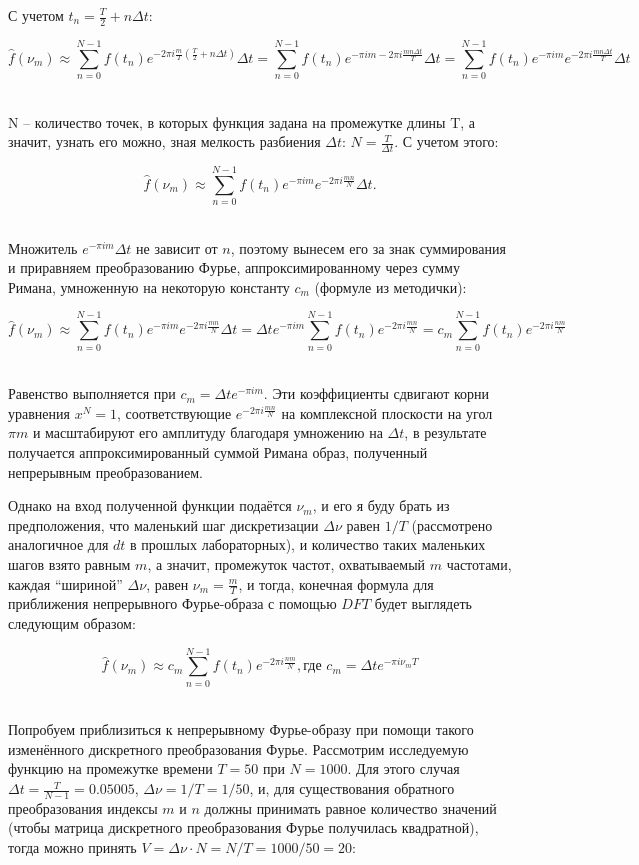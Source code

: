 \documentclass[a4paper]{article}
\begin{document}
С учетом $t_n = \frac{T}{2} + n\Delta t$:

$$
\hat{f}(\nu_m) \approx \sum_{n = 0}^{N - 1} f(t_n)e^{-2\pi i \frac{m}{T} (\frac{T}{2} + n\Delta t)}\Delta t = \sum_{n = 0}^{N - 1} f(t_n)e^{-\pi i m -2\pi i \frac{mn\Delta t}{T}} \Delta t = \sum_{n = 0}^{N - 1} f(t_n)e^{-\pi i m} e^{-2\pi i \frac{mn\Delta t}{T}} \Delta t
$$\

N -- количество точек, в которых функция задана на промежутке длины T, а значит, узнать его можно, зная мелкость разбиения  $\Delta t$: $N = \frac{T}{\Delta t}$. С учетом этого:

$$
\hat{f}(\nu_m) \approx \sum_{n = 0}^{N - 1} f(t_n)e^{-\pi i m} e^{-2\pi i \frac{mn}{N}} \Delta t.
$$\

Множитель $e^{-\pi i m}\Delta t$ не зависит от $n$, поэтому вынесем его за знак суммирования и приравняем преобразованию Фурье, аппроксимированному через сумму Римана, умноженную на некоторую константу $c_m$ (формуле из методички):

$$
\hat{f}(\nu_m) \approx \sum_{n = 0}^{N - 1} f(t_n)e^{-\pi i m} e^{-2\pi i \frac{mn}{N}} \Delta t = \Delta t e^{-\pi i m} \sum_{n = 0}^{N - 1} f(t_n)e^{-2\pi i \frac{mn}{N}} = c_m\sum_{n = 0}^{N - 1} f(t_n)e^{-2\pi i \frac{nm}{N}}
$$\

Равенство выполняется при $c_m = \Delta t e^{-\pi i m}$. Эти коэффициенты сдвигают корни уравнения $x^N = 1$, соответствующие $e^{-2\pi i \frac{mn}{N}}$ на комплексной плоскости на угол $\pi m$ и масштабируют его амплитуду благодаря умножению на $\Delta t$, в результате получается аппроксимированный суммой Римана образ, полученный непрерывным преобразованием.

Однако на вход полученной функции подаётся $\nu_m$, и его я буду брать из предположения, что маленький шаг дискретизации $\Delta \nu$ равен $1/T$ (рассмотрено аналогичное для $dt$ в прошлых лабораторных), и количество таких маленьких шагов взято равным $m$, а значит, промежуток частот, охватываемый $m$ частотами, каждая ``шириной'' $\Delta \nu$, равен $\nu_m = \frac{m}{T}$, и тогда, конечная формула для приближения непрерывного Фурье-образа с помощью $DFT$ будет выглядеть следующим образом:

$$
\hat{f}(\nu_m) \approx c_m \sum_{n = 0}^{N - 1} f(t_n)e^{-2\pi i \frac{nm}{N}}, \text{где } c_m =  \Delta t e^{-\pi i \nu_m T}
$$\ 

Попробуем приблизиться к непрерывному Фурье-образу при помощи такого изменённого дискретного преобразования Фурье. Рассмотрим исследуемую функцию на промежутке времени $T = 50$ при $N = 1000$. Для этого случая $\Delta t = \frac{T}{N-1} = 0.05005$, $\Delta \nu = 1/T = 1/50$, и, для существования обратного преобразования индексы $m$ и $n$ должны принимать равное количество значений (чтобы матрица дискретного преобразования Фурье получилась квадратной), тогда можно принять $V = \Delta \nu \cdot N = N/T = 1000/50 = 20$:
\end{document}
